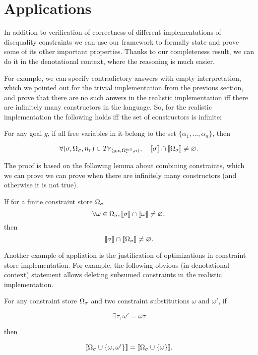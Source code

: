 \section{Applications}
\label{sec:applications}

In addition to verification of correctness of different implementations of disequality constraints we can use our framework to formally
state and prove some of its other important properties. Thanks to our completeness result, we can do it in the denotational context,
where the reasoning is much easier.

For example, we can specify contradictory answers with empty interpretation, which we pointed out for the trivial implementation from the previous section,
and prove that there are no such anwers in the realistic implementation iff there are infinitely many constructors in the language. So, for the realistic implementation the following holds iff the set of constructors is infinite:

\begin{lemma}
For any goal $g$, if all free variables in it belong to the set $\{\alpha_1,\dots,\alpha_n\}$, then

\[ \forall (\sigma, \Omega_\sigma, n_r) \in Tr_{\left<{g, \epsilon, \Omega_\epsilon^{\mathit{init}}, n}\right>}, \quad \llbracket{\sigma}\rrbracket \cap \llbracket{\Omega_\sigma}\rrbracket \neq \varnothing. \]
\end{lemma}

The proof is based on the following lemma about combining constraints, which we can prove we can prove when there are infinitely many constructors (and otherwise it is not true).

\begin{lemma}
If for a finite constraint store $\Omega_\sigma$
\[ \forall \omega \in \Omega_\sigma,  \llbracket{\sigma}\rrbracket \cap \llbracket{\omega}\rrbracket \neq \varnothing, \]
then
\[ \llbracket{\sigma}\rrbracket \cap \llbracket{\Omega_\sigma}\rrbracket \neq \varnothing. \]
\end{lemma}

Another example of appliation is the justification of optimizations in constraint store implementation. For example, the following obvious (in denotational context) statement
allows deleting subsumed constraints in the realistic implementation.

\begin{lemma}
For any constraint store $\Omega_\sigma$ and two constraint substitutions $\omega$ and $\omega'$, if

\[ \exists \tau, \omega' = \omega \tau \]

then

\[ \llbracket{\Omega_\sigma \cup \{\omega, \omega'\}}\rrbracket = \llbracket{\Omega_\sigma \cup \{\omega\}}\rrbracket. \]
\end{lemma}

